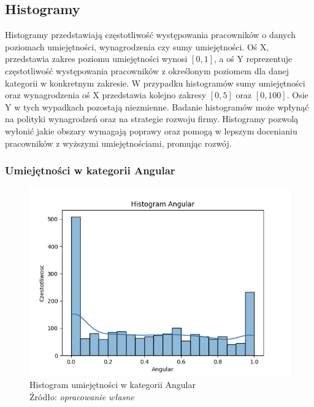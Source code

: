     \subsection{Histogramy}\label{subsec:histogramy}
    \par Histogramy przedstawiają częstotliwość występowania pracowników o danych poziomach umiejętności, wynagrodzenia czy sumy umiejętności. Oś X, przedstawia zakres poziomu umiejętności wynosi $[0, 1]$, a oś Y reprezentuje częstotliwość występowania pracowników z określonym poziomem dla danej kategorii w konkretnym zakresie. W przypadku histogramów sumy umiejętności oraz wynagrodzenia oś X przedstawia kolejno zakresy $[0, 5]$ oraz $[0, 100]$. Osie Y w tych wypadkach pozostają niezmienne. Badanie histogramów może wpłynąć na polityki wynagrodzeń oraz na strategie rozwoju firmy. Histogramy pozwolą wyłonić jakie obszary wymagają poprawy oraz pomogą w lepszym docenianiu pracowników z wyższymi umiejętnościami, promując rozwój.
    
        \subsubsection{Umiejętności w kategorii Angular}
        \begin{figure}[H]
            \centering
            \includegraphics[width=\linewidth]{chapters/Images/hist_angular.png}
            \cprotect\caption{Histogram umiejętności w kategorii Angular\\ Źródło:\textit{ opracowanie własne}}
            \label{fig:hist_angular}
        \end{figure}

